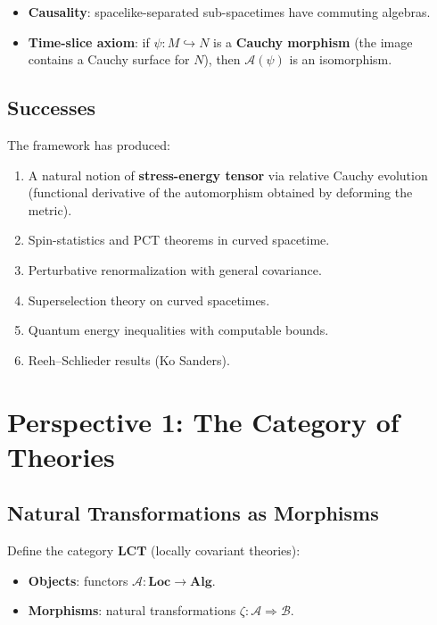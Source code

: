\documentclass[11pt,a4paper]{article}
\begin{document}
\begin{itemize}[nosep]
  \item \textbf{Causality}: spacelike-separated sub-spacetimes have commuting
        algebras.
  \item \textbf{Time-slice axiom}: if $\psi: M \hookrightarrow N$ is a
        \textbf{Cauchy morphism} (the image contains a Cauchy surface for $N$),
        then $\mathscr{A}(\psi)$ is an isomorphism.
\end{itemize}

\subsection{Successes}

The framework has produced:
\begin{enumerate}[nosep]
  \item A natural notion of \textbf{stress-energy tensor} via relative
        Cauchy evolution (functional derivative of the automorphism obtained
        by deforming the metric).
  \item Spin-statistics and PCT theorems in curved spacetime.
  \item Perturbative renormalization with general covariance.
  \item Superselection theory on curved spacetimes.
  \item Quantum energy inequalities with computable bounds.
  \item Reeh--Schlieder results (Ko Sanders).
\end{enumerate}

\section{Perspective 1: The Category of Theories}

\subsection{Natural Transformations as Morphisms}

Define the category $\mathbf{LCT}$ (locally covariant theories):
\begin{itemize}[nosep]
  \item \textbf{Objects}: functors $\mathscr{A}: \mathbf{Loc} \to \mathbf{Alg}$.
  \item \textbf{Morphisms}: natural transformations $\zeta: \mathscr{A} \Rightarrow
        \mathscr{B}$.
\end{itemize}
\end{document}
